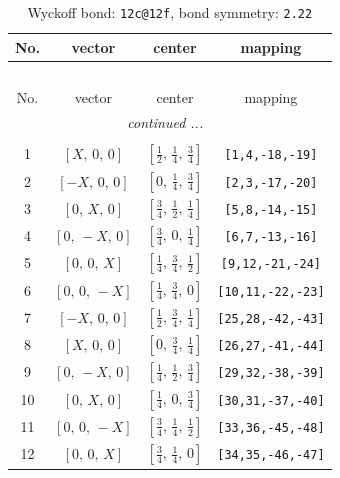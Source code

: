 \documentclass[fleqn,8pt]{jsarticle}
\begin{document}
\renewcommand{\arraystretch}{1.2}
\begin{longtable}{cccc}
\caption{Wyckoff bond: {\tt 12c@12f}, bond symmetry: {\tt 2.22}}
 \\
 \hline \hline
No. & vector & center & mapping \\ \hline \endfirsthead

\multicolumn{3}{l}{\tablename\ \thetable{}} \\
 \hline \hline
No. & vector & center & mapping \\ \hline \endhead

 \hline \hline
\multicolumn{3}{r}{\footnotesize\it continued ...} \\ \endfoot

 \hline \hline
\multicolumn{3}{r}{} \\ \endlastfoot

1 & $\left[ X,\, 0,\, 0 \right]$ & $\left[ \frac{1}{2},\, \frac{1}{4},\, \frac{3}{4} \right]$ & {\tt [1,4,-18,-19]} \\ \hline
2 & $\left[ - X,\, 0,\, 0 \right]$ & $\left[ 0,\, \frac{1}{4},\, \frac{3}{4} \right]$ & {\tt [2,3,-17,-20]} \\ \hline
3 & $\left[ 0,\, X,\, 0 \right]$ & $\left[ \frac{3}{4},\, \frac{1}{2},\, \frac{1}{4} \right]$ & {\tt [5,8,-14,-15]} \\ \hline
4 & $\left[ 0,\, - X,\, 0 \right]$ & $\left[ \frac{3}{4},\, 0,\, \frac{1}{4} \right]$ & {\tt [6,7,-13,-16]} \\ \hline
5 & $\left[ 0,\, 0,\, X \right]$ & $\left[ \frac{1}{4},\, \frac{3}{4},\, \frac{1}{2} \right]$ & {\tt [9,12,-21,-24]} \\ \hline
6 & $\left[ 0,\, 0,\, - X \right]$ & $\left[ \frac{1}{4},\, \frac{3}{4},\, 0 \right]$ & {\tt [10,11,-22,-23]} \\ \hline
7 & $\left[ - X,\, 0,\, 0 \right]$ & $\left[ \frac{1}{2},\, \frac{3}{4},\, \frac{1}{4} \right]$ & {\tt [25,28,-42,-43]} \\ \hline
8 & $\left[ X,\, 0,\, 0 \right]$ & $\left[ 0,\, \frac{3}{4},\, \frac{1}{4} \right]$ & {\tt [26,27,-41,-44]} \\ \hline
9 & $\left[ 0,\, - X,\, 0 \right]$ & $\left[ \frac{1}{4},\, \frac{1}{2},\, \frac{3}{4} \right]$ & {\tt [29,32,-38,-39]} \\ \hline
10 & $\left[ 0,\, X,\, 0 \right]$ & $\left[ \frac{1}{4},\, 0,\, \frac{3}{4} \right]$ & {\tt [30,31,-37,-40]} \\ \hline
11 & $\left[ 0,\, 0,\, - X \right]$ & $\left[ \frac{3}{4},\, \frac{1}{4},\, \frac{1}{2} \right]$ & {\tt [33,36,-45,-48]} \\ \hline
12 & $\left[ 0,\, 0,\, X \right]$ & $\left[ \frac{3}{4},\, \frac{1}{4},\, 0 \right]$ & {\tt [34,35,-46,-47]} \\
\end{longtable}
\end{document}

